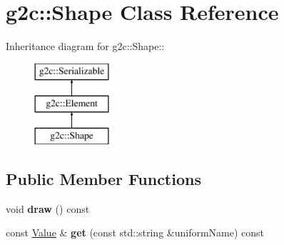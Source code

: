 \hypertarget{classg2c_1_1_shape}{
\section{g2c::Shape Class Reference}
\label{classg2c_1_1_shape}
}
Inheritance diagram for g2c::Shape::\begin{figure}[H]
\begin{center}
\leavevmode
\includegraphics[height=3cm]{classg2c_1_1_shape}
\end{center}
\end{figure}
\subsection*{Public Member Functions}
\begin{DoxyCompactItemize}
\item 
\hypertarget{classg2c_1_1_shape_aac6a51ff8e83b3505176e9b8e19ee20d}{
void {\bfseries draw} () const }
\label{classg2c_1_1_shape_aac6a51ff8e83b3505176e9b8e19ee20d}

\item 
\hypertarget{classg2c_1_1_shape_aeb770b57393650d529f8530fbfe2b881}{
const \hyperlink{classg2c_1_1_value}{Value} \& {\bfseries get} (const std::string \&uniformName) const }
\label{classg2c_1_1_shape_aeb770b57393650d529f8530fbfe2b881}

\end{DoxyCompactItemize}
